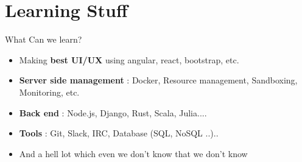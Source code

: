 \section{Learning Stuff}
    \begin{frame}{What Can we learn?}
        \begin{itemize}
            \item<+-> Making \textbf{best UI/UX} using angular, react, bootstrap, etc.
            \item<+-> \textbf{Server side management} : Docker, Resource management, Sandboxing, Monitoring, etc.
            \item<+-> \textbf{Back end} : Node.js, Django, Rust, Scala, Julia....
            \item<+-> \textbf{Tools} : Git, Slack, IRC, Database (SQL, NoSQL ..)..
            \item<+-> And a hell lot which even we don’t know that we don’t know
        \end{itemize}
    \end{frame}




